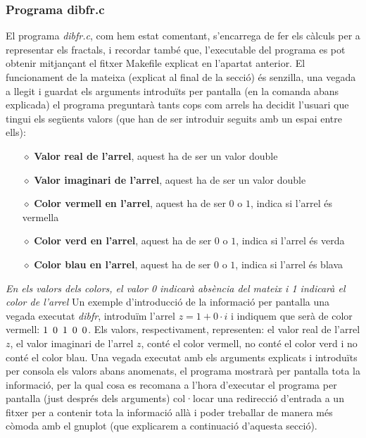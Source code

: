 \documentclass[12pt]{report}
\begin{document}
\subsubsection{Programa dibfr.c}
El programa \textit{dibfr.c}, com hem estat comentant, s'encarrega de fer els càlculs per a representar els fractals, i recordar també que, l'executable del programa es pot obtenir mitjançant el fitxer Makefile explicat en l'apartat anterior.
\newline
El funcionament de la mateixa (explicat al final de la secció) és senzilla, una vegada a llegit i guardat els arguments introduïts per pantalla (en la comanda abans explicada) el programa preguntarà tants cops com arrels ha decidit l'usuari que tingui els següents valors (que han de ser introduir seguits amb un espai entre ells):
\begin{itemize}
\item [$\diamond$] \textbf{Valor real de l'arrel}, aquest ha de ser un valor double
\item [$\diamond$] \textbf{Valor imaginari de l'arrel}, aquest ha de ser un valor double
\item [$\diamond$] \textbf{Color vermell en l'arrel}, aquest ha de ser $0$ o $1$, indica si l'arrel és vermella
\item [$\diamond$] \textbf{Color verd en l'arrel}, aquest ha de ser $0$ o $1$, indica si l'arrel és verda
\item [$\diamond$] \textbf{Color blau en l'arrel}, aquest ha de ser $0$ o $1$, indica si l'arrel és blava
\end{itemize}
\textit{En els valors dels colors, el valor 0 indicarà absència del mateix i 1 indicarà el color de l'arrel}
\newline
Un exemple d'introducció de la informació per pantalla una vegada executat \textit{dibfr}, introduïm l'arrel $z=1+0\cdot i$ i indiquem que serà de color vermell: $1 \hspace{0.5em} 0 \hspace{0.5em} 1 \hspace{0.5em} 0 \hspace{0.5em} 0$.
\newline
Els valors, respectivament, representen: el valor real de l'arrel $z$, el valor imaginari de l'arrel $z$, conté el color vermell, no conté el color verd i no conté el color blau.
\newline
Una vegada executat amb els arguments explicats i introduïts per consola els valors abans anomenats, el programa mostrarà per pantalla tota la informació, per la qual cosa es recomana a l'hora d'executar el programa per pantalla (just després dels arguments) col·locar una redirecció d'entrada a un fitxer per a contenir tota la informació allà i poder treballar de manera més còmoda amb el gnuplot (que explicarem a continuació d'aquesta secció).
\end{document}
